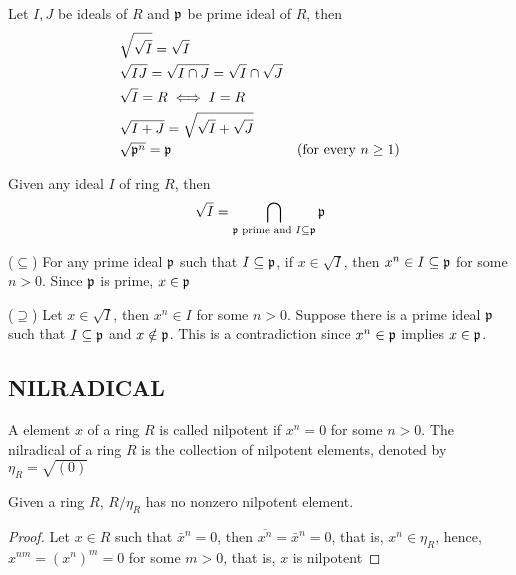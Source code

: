 \begin{remark}
	Let $I, J$ be ideals of $R$ and $\mathfrak{p}$ be prime ideal of $R$, then
	\begin{align*}
		&\sqrt{\sqrt{I}} = \sqrt{I} \\
		&\sqrt{IJ} = \sqrt{I \cap J} = \sqrt{I} \cap \sqrt{J} \\
		&\sqrt{I} = R \iff I = R \\
		&\sqrt{I + J} = \sqrt{\sqrt{I} + \sqrt{J}} \\
		&\sqrt{\mathfrak{p}^n} = \mathfrak{p} &\text{(for every $n \geq 1$)}
	\end{align*}
\end{remark}

\begin{proposition}
	Given any ideal $I$ of ring $R$, then
	$$
		\sqrt{I} = \bigcap_{\mathfrak{p} \text{ prime and } I \subseteq \mathfrak{p}} \mathfrak{p}
	$$
\end{proposition}

\begin{longproof}
	($\subseteq$) For any prime ideal $\mathfrak{p}$ such that $I \subseteq \mathfrak{p}$, if $x \in \sqrt{I}$, then $x^n \in I \subseteq \mathfrak{p}$ for some $n > 0$. Since $\mathfrak{p}$ is prime, $x \in \mathfrak{p}$
	
	($\supseteq$) Let $x \in \sqrt{I}$, then $x^n \in I$ for some $n > 0$. Suppose there is a prime ideal $\mathfrak{p}$ such that $I \subseteq \mathfrak{p}$ and $x \notin \mathfrak{p}$. This is a contradiction since $x^n \in \mathfrak{p}$ implies $x \in \mathfrak{p}$.
\end{longproof}

\subsection{NILRADICAL}

\begin{definition}
	A element $x$ of a ring $R$ is called nilpotent if $x^n = 0$ for some $n > 0$. The nilradical of a ring $R$ is the collection of nilpotent elements, denoted by $\eta_R = \sqrt{(0)}$
\end{definition}

\begin{remark}
	Given a ring $R$, $R / \eta_R$ has no nonzero nilpotent element.
\end{remark}

\begin{proof}
	Let $x \in R$ such that $\bar{x}^n = 0$, then $\overline{x^n} = \bar{x}^n = 0$, that is, $x^n \in \eta_R$, hence, $x^{nm} = (x^n)^m = 0$ for some $m > 0$, that is, $x$ is nilpotent
\end{proof}

